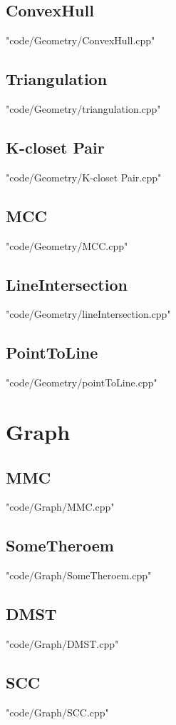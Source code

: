 \documentclass [8pt,a4paper,twocolumn]{article}
\begin{document}
\subsection{ConvexHull}
 {"code/Geometry/ConvexHull.cpp"}
\subsection{Triangulation}
 {"code/Geometry/triangulation.cpp"}
\subsection{K-closet Pair}
 {"code/Geometry/K-closet Pair.cpp"}
\subsection{MCC}
 {"code/Geometry/MCC.cpp"}
\subsection{LineIntersection}
 {"code/Geometry/lineIntersection.cpp"}
\subsection{PointToLine}
 {"code/Geometry/pointToLine.cpp"}
\section{Graph}
\subsection{MMC}
 {"code/Graph/MMC.cpp"}
\subsection{SomeTheroem}
 {"code/Graph/SomeTheroem.cpp"}
\subsection{DMST}
 {"code/Graph/DMST.cpp"}
\subsection{SCC}
 {"code/Graph/SCC.cpp"}
\end{document}
